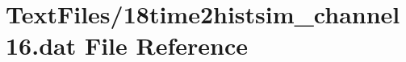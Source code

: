 \hypertarget{18time2histsim__channel16_8dat}{}\section{Text\+Files/18time2histsim\+\_\+channel16.dat File Reference}
\label{18time2histsim__channel16_8dat}
